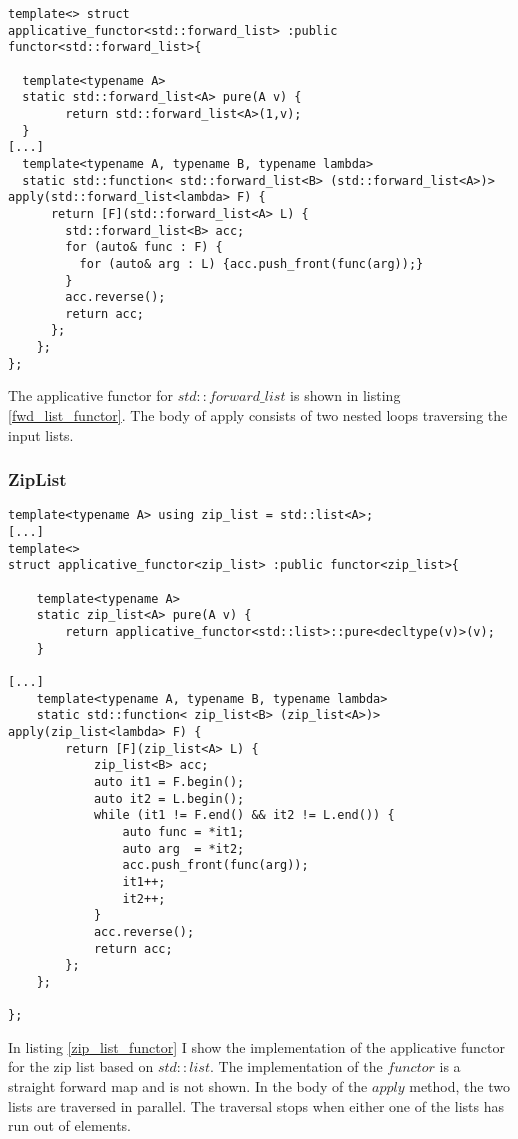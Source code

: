 \documentclass[12pt,fleqn]{article}
\begin{document}
%
%
\begin{minipage}{\linewidth}
\begin{lstlisting}[caption=std::forward\_list is an applicative functor, label=fwd_list_functor]
template<> struct 
applicative_functor<std::forward_list> :public functor<std::forward_list>{

  template<typename A>
  static std::forward_list<A> pure(A v) {
		return std::forward_list<A>(1,v);
  }
[...]
  template<typename A, typename B, typename lambda>
  static std::function< std::forward_list<B> (std::forward_list<A>)> apply(std::forward_list<lambda> F) {
      return [F](std::forward_list<A> L) {
	    std::forward_list<B> acc;
	    for (auto& func : F) {
	      for (auto& arg : L) {acc.push_front(func(arg));}
        } 
	    acc.reverse();
	    return acc;
      };
    };
};
\end{lstlisting}
\end{minipage}
%
%
%
The applicative functor for $std::forward\_list$ is shown in listing \ref{fwd_list_functor}.
The body of apply consists of two nested loops traversing the input lists. 
%
\subsubsection{ZipList}
%   


%
%
\begin{minipage}{\linewidth}
\begin{lstlisting}[caption=ziplist is an applicative functor, label=zip_list_functor]
template<typename A> using zip_list = std::list<A>;
[...]
template<> 
struct applicative_functor<zip_list> :public functor<zip_list>{

    template<typename A>
    static zip_list<A> pure(A v) {
		return applicative_functor<std::list>::pure<decltype(v)>(v);
    }

[...]
    template<typename A, typename B, typename lambda>
    static std::function< zip_list<B> (zip_list<A>)> apply(zip_list<lambda> F) {
		return [F](zip_list<A> L) {
			zip_list<B> acc;
			auto it1 = F.begin();
			auto it2 = L.begin();
			while (it1 != F.end() && it2 != L.end()) {
				auto func = *it1;
				auto arg  = *it2;
				acc.push_front(func(arg));
				it1++;
				it2++;
			}
			acc.reverse();
			return acc;
		};
	};
	
};
\end{lstlisting}
\end{minipage}
%
%
%

In listing \ref{zip_list_functor} I show the implementation of the applicative functor for the zip list based on $std::list$. 
The implementation of the $functor$ is  a straight forward map and is not shown. 
In the body of the $apply$ method, the two lists are traversed in parallel. The traversal stops when either one of the lists has run out of elements.
\end{document}
